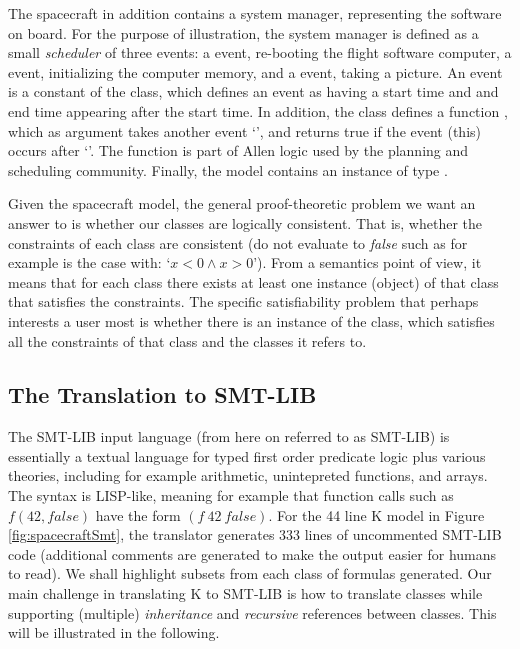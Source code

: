 The spacecraft in addition contains a system manager, representing
the software on board. For the purpose of illustration, the system manager is defined as a small {\em scheduler} of three events: 
a  event, re-booting the flight software computer, a  event, initializing the computer memory, and a 
 event, taking a picture. An event is a constant
of the  class, which defines an event as having a start time and and end time appearing after the start time. In addition, the  class defines a function ,
which as argument takes another event `', 
and returns true if the event (this) occurs after `'.
The  function is part of Allen logic 
\cite{allen-logic-84} used by the planning and scheduling community. 
%
Finally, the model contains an instance  of type
.

Given the spacecraft model, the general proof-theoretic
problem we want an answer to is whether our classes are logically consistent. That is, whether the constraints of each class are consistent (do not evaluate to {\em false} such as for example is
the case with: `$x < 0 \wedge x > 0$'). From a semantics point of view, it means that for each class there exists at least one instance (object) of that class that satisfies the constraints. 
The specific satisfiability problem that perhaps interests a
user most is whether there is an instance of the  class, which satisfies all the constraints of that class and the classes it refers to.

\subsection{The Translation to SMT-LIB}

The SMT-LIB input language (from here on referred to as SMT-LIB)
is essentially a textual language for typed first order predicate logic plus various theories, including for example arithmetic,
unintepreted functions, and arrays. The syntax is LISP-like,
meaning for example that function calls such as $f(42,false)$
have the form $(f\ 42\ false)$. For the 44 line K model in Figure 
\ref{fig:spacecraftSmt}, the translator generates 333 lines of 
uncommented SMT-LIB code  (additional comments are generated to 
make the output easier for 
humans to read). We shall highlight subsets from each class of
formulas generated. Our main challenge in translating K to SMT-LIB 
is how to translate classes while supporting (multiple) {\em 
inheritance} and {\em recursive} references between 
classes. This will be illustrated in the following. 

